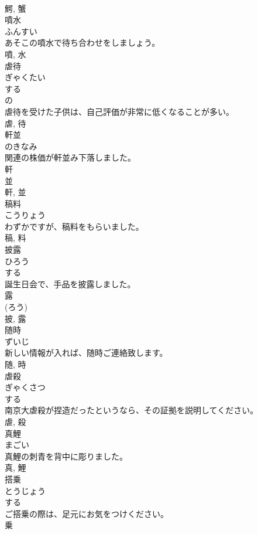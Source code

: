 \documentclass[8pt]{extreport}
\begin{document}
\begin{CJK}{UTF8}{min}
\\	鰐, 蟹	
\\	噴水	
\\	ふんすい	
\\	あそこの噴水で待ち合わせをしましょう。	
\\	噴, 水	
\\	虐待	
\\	ぎゃくたい	
\\	する 
\\	の 
\\	虐待を受けた子供は、自己評価が非常に低くなることが多い。	
\\	虐, 待	
\\	軒並	
\\	のきなみ	
\\	関連の株価が軒並み下落しました。	
\\	軒 
\\	並 
\\	軒, 並	
\\	稿料	
\\	こうりょう	
\\	わずかですが、稿料をもらいました。	
\\	稿, 料	
\\	披露	
\\	ひろう	
\\	する 
\\	誕生日会で、手品を披露しました。	
\\	露 
\\	(ろう) 
\\	披, 露	
\\	随時	
\\	ずいじ	
\\	新しい情報が入れば、随時ご連絡致します。	
\\	随, 時	
\\	虐殺	
\\	ぎゃくさつ	
\\	する 
\\	南京大虐殺が捏造だったというなら、その証拠を説明してください。	
\\	虐, 殺	
\\	真鯉	
\\	まごい	
\\	真鯉の刺青を背中に彫りました。	
\\	真, 鯉	
\\	搭乗	
\\	とうじょう	
\\	する 
\\	ご搭乗の際は、足元にお気をつけください。	
\\	乗 

\end{CJK}
\end{document}
